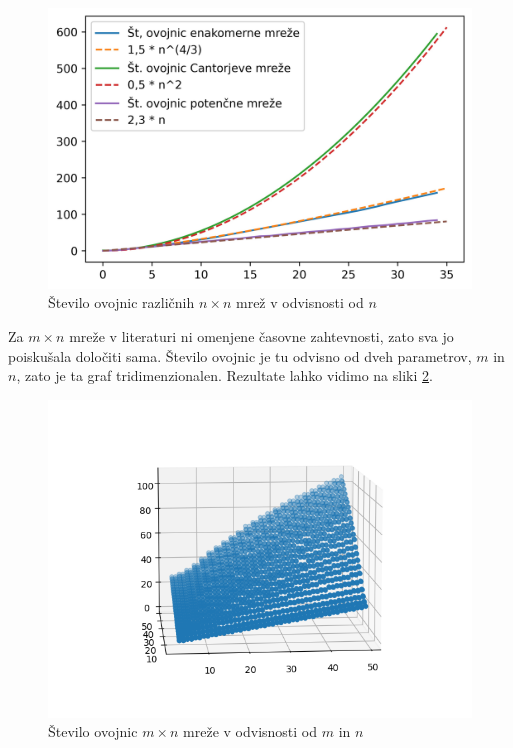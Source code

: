 \documentclass[a4paper]{article}
\begin{document}
\begin{figure}[!h]
	\centering
	\caption{Število ovojnic različnih $n \times n$ mrež v odvisnosti od $n$}
	\label{fig:st_ovojnic}
	\includegraphics[scale=0.7]{slike/st_ovojnic.jpg}
\end{figure}

Za $m \times n$ mreže v literaturi ni omenjene časovne zahtevnosti, zato sva jo poiskušala določiti sama. Število ovojnic je tu odvisno od dveh parametrov, $m$ in $n$, zato je ta graf 
tridimenzionalen. Rezultate lahko vidimo na sliki \ref{fig:3d}.

\begin{figure}[!h]
	\centering
	\caption{Število ovojnic $m \times n$ mreže v odvisnosti od $m$ in $n$}
	\label{fig:3d}
	\includegraphics[scale=0.7]{slike/mxn_3d.png}
\end{figure}
\end{document}
